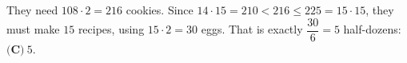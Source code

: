 They need $108\cdot2=216$ cookies. Since $14\cdot15=210<216\le225=15\cdot15$, they must make $15$ recipes, using $15\cdot2=30$ eggs. That is exactly $\dfrac{30}{6}=5$ half-dozens: $\boxed{\textbf{(C)}\ 5}$.

